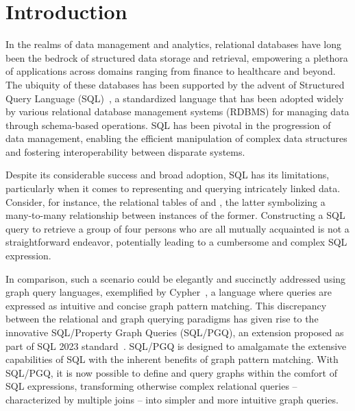 \section{Introduction}
\label{sec:introduction}

In the realms of data management and analytics, relational databases have long been the bedrock of structured data storage and retrieval, empowering a plethora of applications across domains ranging from finance to healthcare and beyond. The ubiquity of these databases has been supported by the advent of Structured Query Language (SQL)~\cite{chamberlin1974sequel}, a standardized language that has been adopted widely by various relational database management systems (RDBMS) for managing data through schema-based operations. SQL has been pivotal in the progression of data management, enabling the efficient manipulation of complex data structures and fostering interoperability between disparate systems.

Despite its considerable success and broad adoption, SQL has its limitations, particularly when it comes to representing and querying intricately linked data. Consider, for instance, the relational tables of  and , the latter symbolizing a many-to-many relationship between instances of the former. Constructing a SQL query to retrieve a group of four persons who are all mutually acquainted is not a straightforward endeavor, potentially leading to a cumbersome and complex SQL expression.

In comparison, such a scenario could be elegantly and succinctly addressed using graph query languages, exemplified by Cypher~\cite{opencypher}, a language where queries are expressed as intuitive and concise graph pattern matching. This discrepancy between the relational and graph querying paradigms has given rise to the innovative SQL/Property Graph Queries (SQL/PGQ), an extension proposed as part of SQL 2023 standard~\cite{sql-pgq}. SQL/PGQ is designed to amalgamate the extensive capabilities of SQL with the inherent benefits of graph pattern matching. With SQL/PGQ, it is now possible to define and query graphs within the comfort of SQL expressions, transforming otherwise complex relational queries -- characterized by multiple joins -- into simpler and more intuitive graph queries.

